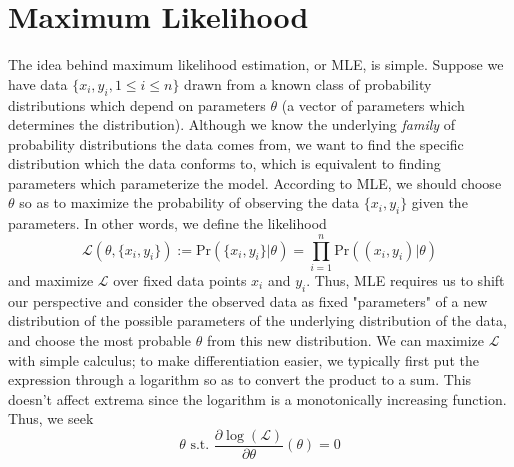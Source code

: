 \documentclass{article}
\begin{document}
\section{Maximum Likelihood}
The idea behind maximum likelihood estimation, or MLE, is simple. Suppose we have data $ \{ x_i, y_i, 1 \leq i \leq n \}$ drawn from a known class of probability distributions which depend on parameters $ \theta $ (a vector of parameters which determines the distribution). Although we know the underlying \textit{family} of probability distributions the data comes from, we want to find the specific distribution which the data conforms to, which is equivalent to finding parameters which parameterize the model. According to MLE, we should choose $ \theta $ so as to maximize the probability of observing the data $ \{ x_i, y_i \} $ given the parameters. In other words, we define the likelihood
$$ \mathcal{L}(\theta, \{ x_i, y_i \}) := \text{Pr}(\{ x_i, y_i \} | \theta) = \prod_{i = 1}^n \text{Pr}((x_i, y_i) | \theta) $$
and maximize $ \mathcal{L} $ over fixed data points $ x_i $ and $ y_i $. Thus, MLE requires us to shift our perspective and consider the observed data as fixed "parameters" of a new distribution of the possible parameters of the underlying distribution of the data, and choose the most probable $ \theta $ from this new distribution.
\newline
We can maximize $ \mathcal{L} $ with simple calculus; to make differentiation easier, we typically first put the expression through a logarithm so as to convert the product to a sum. This doesn't affect extrema since the logarithm is a monotonically increasing function. Thus, we seek
$$ \theta \text{ s.t. } \frac{\partial \log(\mathcal{L})}{\partial \theta} (\theta) = 0 $$
\end{document}
